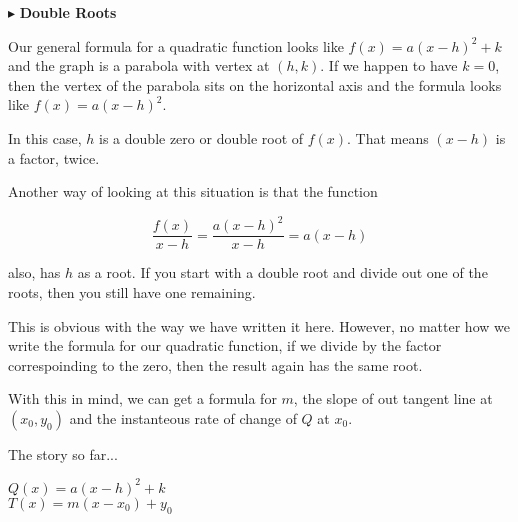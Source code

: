 \documentclass{ximera}
\begin{document}
$\blacktriangleright$ \textbf{\textcolor{purple!85!blue}{Double Roots}} 

Our general formula for a quadratic function looks like  $f(x) = a (x - h)^2 + k$ and the graph is a parabola with vertex at $(h, k)$. If we happen to have $k = 0$, then the vertex of the parabola sits on the horizontal axis and the formula looks like $f(x) = a (x - h)^2$.


In this case, $h$ is a double zero or double root of $f(x)$.  That means $(x - h)$ is a factor, twice.


Another way of looking at this situation is that the function


\[
\frac{f(x)}{x-h} = \frac{a (x - h)^2}{x - h} = a (x - h)
\]


also, has $h$ as a root.  If you start with a double root and divide out one of the roots, then you still have one remaining.

This is obvious with the way we have written it here.  However, no matter how we write the formula for our quadratic function, if we divide by the factor correspoinding to the zero, then the result again has the same root.


With this in mind, we can get a formula for $m$, the slope of out tangent line at $(x_0, y_0)$ and the instanteous rate of change of $Q$ at $x_0$.






The story so far...

$Q(x) = a (x - h)^2 + k$ \\

$T(x) = m(x - x_0) + y_0$ \\
\end{document}
